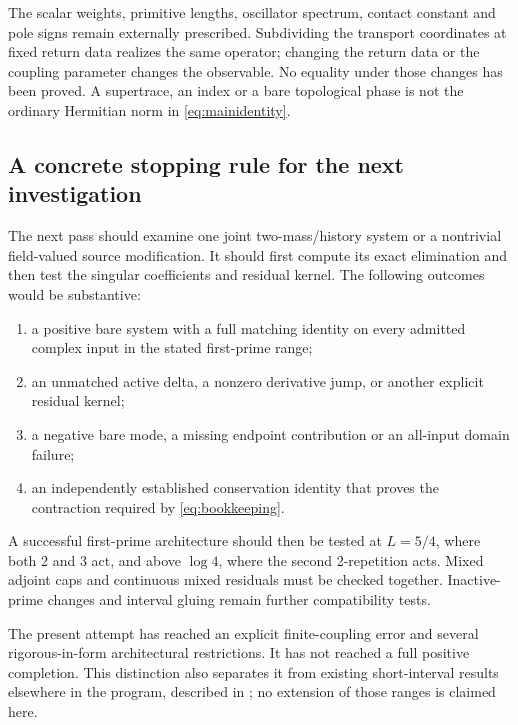 \documentclass[11pt]{article}
\numberwithin{equation}{section}
\theoremstyle{definition}
\theoremstyle{remark}
\begin{document}
The scalar weights, primitive lengths, oscillator spectrum, contact constant and pole signs remain externally prescribed. Subdividing the transport coordinates at fixed return data realizes the same operator; changing the return data or the coupling parameter changes the observable. No equality under those changes has been proved. A supertrace, an index or a bare topological phase is not the ordinary Hermitian norm in \eqref{eq:mainidentity}.

\subsection{A concrete stopping rule for the next investigation}
The next pass should examine one joint two-mass/history system or a nontrivial field-valued source modification. It should first compute its exact elimination and then test the singular coefficients and residual kernel. The following outcomes would be substantive:
\begin{enumerate}
\item a positive bare system with a full matching identity on every admitted complex input in the stated first-prime range;
\item an unmatched active delta, a nonzero derivative jump, or another explicit residual kernel;
\item a negative bare mode, a missing endpoint contribution or an all-input domain failure;
\item an independently established conservation identity that proves the contraction required by \eqref{eq:bookkeeping}.
\end{enumerate}
A successful first-prime architecture should then be tested at $L=5/4$, where both 2 and 3 act, and above $\log4$, where the second 2-repetition acts. Mixed adjoint caps and continuous mixed residuals must be checked together. Inactive-prime changes and interval gluing remain further compatibility tests.

The present attempt has reached an explicit finite-coupling error and several rigorous-in-form architectural restrictions. It has not reached a full positive completion. This distinction also separates it from existing short-interval results elsewhere in the program, described in \cite{background}; no extension of those ranges is claimed here.

\appendix
\end{document}
